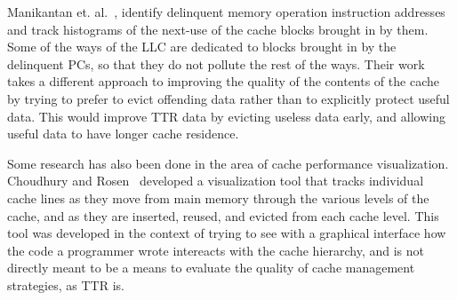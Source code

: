 

Manikantan et. al.~\cite{manikantanrajan11}, identify delinquent memory operation instruction addresses
and track histograms of the next-use of the cache blocks brought in by them.
Some of the ways of the LLC are dedicated to blocks brought in by the
delinquent PCs, so that they do not pollute the rest of the ways.
Their work takes a different approach to improving the quality of the contents of the cache
by trying to prefer to evict offending data rather than to explicitly protect useful data.  This would 
improve TTR data by evicting useless data early, and allowing useful data to have longer cache residence.

Some research has also been done in the area of cache performance visualization.
Choudhury and Rosen~\cite{choudhury2011} developed a visualization tool that 
tracks individual cache lines as they move from main memory through the
various levels of the cache, and as they are inserted, reused, and evicted 
from each cache level.  This tool was developed in the context of trying
to see with a graphical interface how the code a programmer wrote intereacts with the cache hierarchy,
and is not directly meant to be a means to evaluate the quality of cache management strategies, as TTR is.



